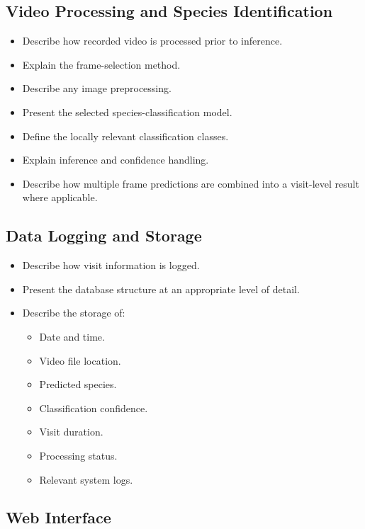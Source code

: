 \subsection{Video Processing and Species Identification}
\label{subsec:VideoProcessingSpeciesID}

\begin{itemize}
    \item Describe how recorded video is processed prior to inference.
    \item Explain the frame-selection method.
    \item Describe any image preprocessing.
    \item Present the selected species-classification model.
    \item Define the locally relevant classification classes.
    \item Explain inference and confidence handling.
    \item Describe how multiple frame predictions are combined into a visit-level result where applicable.
\end{itemize}


\subsection{Data Logging and Storage}
\label{subsec:DataLoggingStorage}

\begin{itemize}
    \item Describe how visit information is logged.
    \item Present the database structure at an appropriate level of detail.
    \item Describe the storage of:
    \begin{itemize}
        \item Date and time.
        \item Video file location.
        \item Predicted species.
        \item Classification confidence.
        \item Visit duration.
        \item Processing status.
        \item Relevant system logs.
    \end{itemize}
\end{itemize}


\subsection{Web Interface}
\label{subsec:WebInterfaceDesign}

